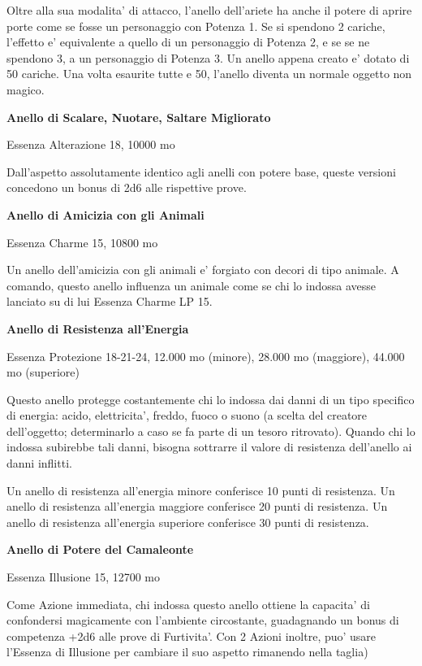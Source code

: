\documentclass[a4paper,11pt,twoside,openany]{book}
\begin{document}
{		Oltre alla sua modalita' di attacco, l'anello dell'ariete ha anche il potere di aprire porte come se fosse un personaggio con Potenza 1. Se si spendono 2 cariche, l'effetto e' equivalente a quello di un personaggio di Potenza 2, e se se ne spendono 3, a un personaggio di Potenza 3. Un anello appena creato e' dotato di 50 cariche. Una volta esaurite tutte e 50, l'anello diventa un normale oggetto non magico.
		
		\textbf{Anello di Scalare, Nuotare, Saltare Migliorato}
		
		Essenza Alterazione 18, 10000 mo
		
		Dall'aspetto assolutamente identico agli anelli con potere base, queste
		versioni concedono un bonus di 2d6 alle rispettive prove.
		
		\textbf{Anello di Amicizia con gli Animali}
		
		Essenza Charme 15, 10800 mo
		
		Un anello dell'amicizia con gli animali e' forgiato con decori di tipo animale. A comando, questo anello influenza un animale come se chi lo indossa avesse lanciato su di lui Essenza Charme LP 15.
		
		\textbf{Anello di Resistenza all'Energia}
		
		Essenza Protezione 18-21-24, 12.000 mo (minore), 28.000 mo (maggiore),
		44.000 mo (superiore)
		
		Questo anello protegge costantemente chi lo indossa dai danni di un tipo specifico di energia: acido, elettricita', freddo, fuoco o suono (a scelta del creatore dell'oggetto; determinarlo a caso se fa parte di un tesoro ritrovato). Quando chi lo indossa subirebbe tali danni, bisogna sottrarre il valore di resistenza dell'anello ai danni inflitti.
		
		Un anello di resistenza all'energia minore conferisce 10 punti di resistenza. Un anello di resistenza all'energia maggiore conferisce 20 punti di resistenza. Un anello di resistenza all'energia superiore conferisce 30 punti di resistenza.
		
		\textbf{Anello di Potere del Camaleonte}
		
		Essenza Illusione 15, 12700 mo
		
		Come Azione immediata, chi indossa questo anello ottiene la capacita' di confondersi magicamente con l'ambiente circostante, guadagnando un bonus di competenza +2d6 alle prove di Furtivita'. Con 2 Azioni inoltre, puo' usare l'Essenza di Illusione per cambiare il suo aspetto rimanendo nella taglia)
		
}
\end{document}
